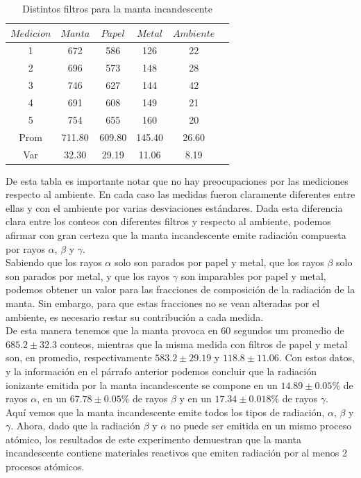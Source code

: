 \documentclass[%
 reprint,
 amsmath,amssymb,
 aps,
]{revtex4-1}
\begin{document}
\begin{table}[h!]
\centering
\begin{tabular}{|c|c|c|c|c|c|}
	\hline $ Medicion $ & $Manta$ & $Papel$ & $Metal$ & $Ambiente$ \\
	\hline\hline
	1&672&586&126&22\\
	2&696&573&148&28\\
	3&746&627&144&42\\
	4&691&608&149&21\\
	5&754&655&160&20\\
	Prom&711.80&609.80&145.40&26.60\\
	Var&32.30&29.19&11.06&8.19\\
		[1ex] 
 \hline
 \end{tabular} 
  \caption{Distintos filtros para la manta incandescente}
\label{table:incandescente} 
\end{table}

De esta tabla es importante notar que no hay preocupaciones por las mediciones respecto al ambiente. En cada caso las medidas fueron claramente diferentes entre ellas y con el ambiente por varias desviaciones estándares. Dada esta diferencia clara entre los conteos con diferentes filtros y respecto al ambiente, podemos afirmar con gran certeza que la manta incandescente emite radiación compuesta por rayos $\alpha$, $\beta$ y $\gamma$.\\

Sabiendo que los rayos $\alpha$ solo son parados por papel y metal, que los rayos $\beta$ solo son parados por metal, y que los rayos $\gamma$ son imparables por papel y metal, podemos obtener un valor para las fracciones de composición de la radiación de la manta. Sin embargo, para que estas fracciones no se vean alteradas por el ambiente, es necesario restar su contribución a cada medida.\\

De esta manera tenemos que la manta provoca en 60 segundos um promedio de $685.2\pm32.3$ conteos, mientras que la misma medida con filtros de papel y metal son, en promedio, respectivamente $583.2\pm29.19$ y $118.8\pm11.06$. Con estos datos, y la información en el párrafo anterior podemos concluir que la radiación ionizante emitida por la manta incandescente se compone en un $14.89\pm0.05\%$ de rayos $\alpha$, en un $67.78\pm0.05\%$ de rayos $\beta$ y en un $17.34 \pm0.018\%$ de rayos $\gamma$.\\

Aquí vemos que la manta incandescente emite todos los tipos de radiación, $\alpha$, $\beta$ y $\gamma$. Ahora, dado que la radiación $\beta$ y $\alpha$ no puede ser emitida en un mismo proceso atómico, los resultados de este experimento demuestran que la manta incandescente contiene materiales reactivos que emiten radiación por al menos 2 procesos atómicos.\\
\end{document}
